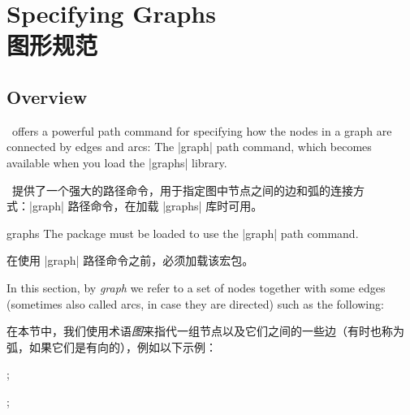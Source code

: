 \setcounter{section}{18}
\setcounter{subsection}{3}
\setcounter{subsubsection}{0}
%
%
%


\section{Specifying Graphs\\图形规范}
\label{section-library-graphs}

\subsection{Overview}

\tikzname\ offers a powerful path command for specifying how the nodes in a
graph are connected by edges and arcs: The |graph| path command, which becomes
available when you load the |graphs| library.

\tikzname\ 提供了一个强大的路径命令，用于指定图中节点之间的边和弧的连接方式：|graph| 路径命令，在加载 |graphs| 库时可用。

\begin{tikzlibrary}{graphs}
    The package must be loaded to use the |graph| path command.

    在使用 |graph| 路径命令之前，必须加载该宏包。
  \end{tikzlibrary}

In this section, by \emph{graph} we refer to a set of nodes together with some
edges (sometimes also called arcs, in case they are directed) such as the
following:

在本节中，我们使用术语\emph{图}来指代一组节点以及它们之间的一些边（有时也称为弧，如果它们是有向的），例如以下示例：

%
\begin{codeexample}[preamble={\usetikzlibrary{graphs}}]
\tikz {};
\end{codeexample}

\begin{codeexample}[preamble={\usetikzlibrary{graphs.standard}}]
\tikz {};
\end{codeexample}

